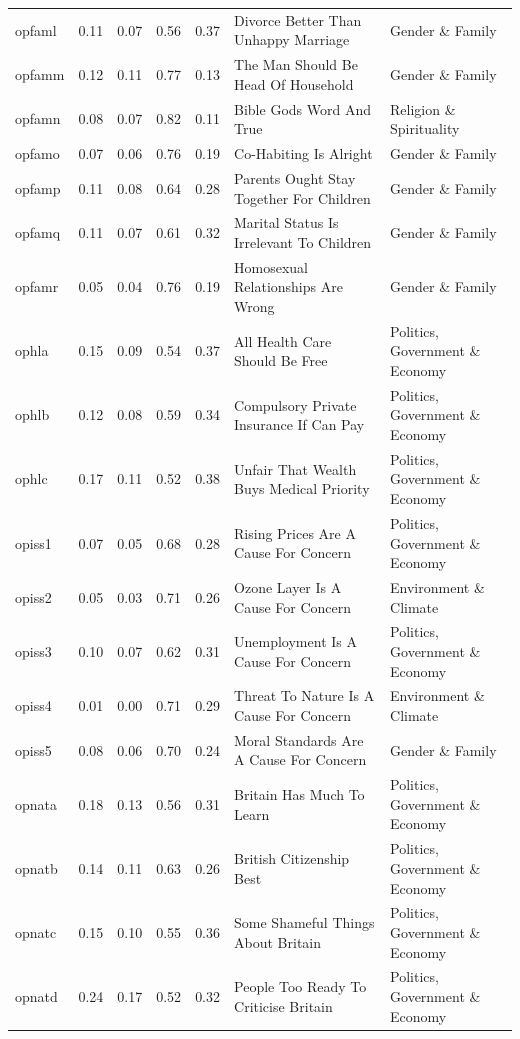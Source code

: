 \documentclass[
  12pt,
]{article}
\begin{document}
\begin{landscape}
\begin{scriptsize}
\begin{longtable}{|p{1.75in}|p{0.3in}|p{0.3in}|p{0.3in}|p{0.3in}|p{2.5in}|p{2.5in}}
opfaml & 0.11 & 0.07 & 0.56 & 0.37 & Divorce Better Than Unhappy Marriage & Gender \& Family \\ 
opfamm & 0.12 & 0.11 & 0.77 & 0.13 & The Man Should Be Head Of Household & Gender \& Family \\ 
opfamn & 0.08 & 0.07 & 0.82 & 0.11 & Bible Gods Word And True & Religion \& Spirituality \\ 
opfamo & 0.07 & 0.06 & 0.76 & 0.19 & Co-Habiting Is Alright & Gender \& Family \\ 
opfamp & 0.11 & 0.08 & 0.64 & 0.28 & Parents Ought Stay Together For Children & Gender \& Family \\ 
opfamq & 0.11 & 0.07 & 0.61 & 0.32 & Marital Status Is Irrelevant To Children & Gender \& Family \\ 
opfamr & 0.05 & 0.04 & 0.76 & 0.19 & Homosexual Relationships Are Wrong & Gender \& Family \\ 
ophla & 0.15 & 0.09 & 0.54 & 0.37 & All Health Care Should Be Free & Politics, Government \& Economy \\ 
ophlb & 0.12 & 0.08 & 0.59 & 0.34 & Compulsory Private Insurance If Can Pay & Politics, Government \& Economy \\ 
ophlc & 0.17 & 0.11 & 0.52 & 0.38 & Unfair That Wealth Buys Medical Priority & Politics, Government \& Economy \\ 
opiss1 & 0.07 & 0.05 & 0.68 & 0.28 & Rising Prices Are A Cause For Concern & Politics, Government \& Economy \\ 
opiss2 & 0.05 & 0.03 & 0.71 & 0.26 & Ozone Layer Is A Cause For Concern & Environment \& Climate \\ 
opiss3 & 0.10 & 0.07 & 0.62 & 0.31 & Unemployment Is A Cause For Concern & Politics, Government \& Economy \\ 
opiss4 & 0.01 & 0.00 & 0.71 & 0.29 & Threat To Nature Is A Cause For Concern & Environment \& Climate \\ 
opiss5 & 0.08 & 0.06 & 0.70 & 0.24 & Moral Standards Are A Cause For Concern & Gender \& Family \\ 
opnata & 0.18 & 0.13 & 0.56 & 0.31 & Britain Has Much To Learn & Politics, Government \& Economy \\ 
opnatb & 0.14 & 0.11 & 0.63 & 0.26 & British Citizenship Best & Politics, Government \& Economy \\ 
opnatc & 0.15 & 0.10 & 0.55 & 0.36 & Some Shameful Things About Britain & Politics, Government \& Economy \\ 
opnatd & 0.24 & 0.17 & 0.52 & 0.32 & People Too Ready To Criticise Britain & Politics, Government \& Economy \\ 

\end{longtable}
\end{scriptsize}
\end{landscape}
\end{document}
